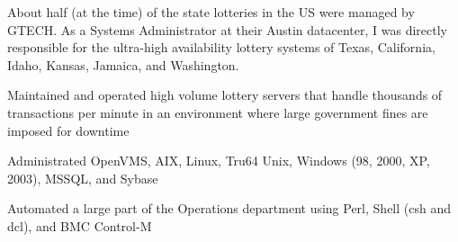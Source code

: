 \documentclass[]{SBResume}
\begin{document}
\begin{resume}
{      About half (at the time) of the state lotteries in the US were
      managed by GTECH. As a Systems Administrator at their Austin
      datacenter, I was directly responsible for the ultra-high
      availability lottery systems of Texas, California, Idaho,
      Kansas, Jamaica, and Washington.
      
      \begin{resumeitemize}
      \item{Maintained and operated high volume lottery servers that handle thousands of transactions per minute in an environment where large government fines are imposed for downtime}
      \item{Administrated OpenVMS, AIX, Linux, Tru64  Unix, Windows (98, 2000, XP, 2003), MSSQL, and Sybase}
      \item{Automated a large part of the Operations department using Perl, Shell (csh and dcl), and BMC Control-M}
      \end{resumeitemize}
    }
    
    \iffalse
    \resumeentry
        {2002-2004}
        {\ }
        {Manning Environmental Inc.}
        {Software Engineer}
        {
          
          Manning is a small, family-owned business in my hometown that
          designs and manufactures automatic fluid samplers; essentially
          robots that periodically pump water from a water treatment
          system into containers to send to a laboratory.
          
          \begin{resumeitemize}
          \item{Embedded programming for Zilog and Microchip architectures}
          \item{Maintained company web site, and several other sites on contract}
          \item{Circuit design verification and debugging}
          \item{Designed a low-cost microphone-based fluid detection circuit}
          \item{Designed production tests for new circuit boards}
          \end{resumeitemize}
        }
    \resumeentry
        {2000}
        {\ }
        {University of Texas: Applied Research Labs}
        {Java Programmer (paid intern)}
        {
          
          I obtained this summer programming internship while still in
          high school, learned Linux and Java while on-the-job, and
          completed all of my tasks successfully.
          
          \begin{resumeitemize}
          \item{Updated Java components for a U.S. Department of Defense project}
          \item{Assembled and installed new employee PC workstations}
          \item{Assisted staff with physical labor of office relocation}
          \end{resumeitemize}
        }
    \fi
\end{resume}
\end{document}
